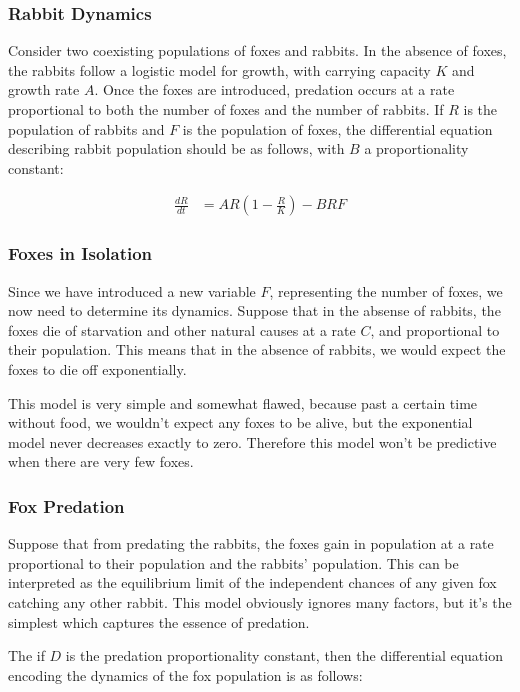 \documentclass{article}
\begin{document}
\subsubsection{Rabbit Dynamics}

Consider two coexisting populations of foxes and rabbits.
In the absence of foxes, the rabbits follow a logistic model
	for growth, with carrying capacity $K$ and growth rate $A$.
Once the foxes are introduced, predation occurs at a rate proportional
	to both the number of foxes and the number of rabbits.
If $R$ is the population of rabbits and $F$ is the population of 
	foxes, the differential equation describing rabbit population
	should be as follows, with $B$ a proportionality constant:

\begin{align}
	\frac{dR}{dt} & = A R \left( 1 - \frac{R}{K} \right) - B R F
\end{align}

\subsubsection{Foxes in Isolation}

Since we have introduced a new variable $F$, representing the number
	of foxes, we now need to determine its dynamics.
Suppose that in the absense of rabbits, the foxes die of starvation
	and other natural causes at a rate $C$, and proportional to their
	population.
This means that in the absence of rabbits, we would expect the foxes
	to die off exponentially.

This model is very simple and somewhat flawed, because past a certain
	time without food, we wouldn't expect any foxes to be alive,
	but the exponential model never decreases exactly to zero.
Therefore this model won't be predictive when there are very few
	foxes.

\subsubsection{Fox Predation}

Suppose that from predating the rabbits, the foxes gain in population
	at a rate proportional to their population and the rabbits' population.
This can be interpreted as the equilibrium limit of the independent
	chances of any given fox catching any other rabbit.
This model obviously ignores many factors, but it's the simplest which
	captures the essence of predation.

The if $D$ is the predation proportionality constant, then the differential
	equation encoding the dynamics of the fox population
	is as follows:
\end{document}
